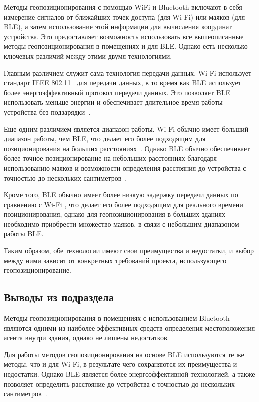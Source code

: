 Методы геопозиционирования с помощью WiFi и Bluetooth включают в себя измерение сигналов от ближайших точек доступа (для Wi-Fi) или маяков (для BLE), а затем использование этой информации для вычисления координат устройства. Это предоставляет возможность использовать все вышеописанные методы геопозиционирования в помещениях и для BLE. Однако есть несколько ключевых различий между этими двумя технологиями.

Главным различием служит сама технология передачи данных. Wi-Fi использует стандарт IEEE 802.11~\cite{ieee802} для передачи данных, в то время как BLE использует более энергоэффективный протокол передачи данных. Это позволяет BLE использовать меньше энергии и обеспечивает длительное время работы устройства без подзарядки~\cite{bluetooth}.

Еще одним различием является диапазон работы. Wi-Fi обычно имеет больший диапазон работы, чем BLE, что делает его более подходящим для позиционирования на больших расстояниях~\cite{wlan}. Однако BLE обычно обеспечивает более точное позиционирование на небольших расстояниях благодаря использованию маяков и возможности определения расстояния до устройства с точностью до нескольких сантиметров~\cite{android-analysis}.

Кроме того, BLE обычно имеет более низкую задержку передачи данных по сравнению с Wi-Fi \cite{android-analysis}, что делает его более подходящим для реального времени позиционирования, однако для геопозиционирования в больших зданиях необходимо приобрести множество маяков, в связи с небольшим диапазоном работы BLE.

Таким образом, обе технологии имеют свои преимущества и недостатки, и выбор между ними зависит от конкретных требований проекта, использующего геопозиционирование.

\clearpage

\subsection*{Выводы из подраздела}

Методы геопозиционирования в помещениях с использованием Bluetooth являются одними из наиболее эффективных средств определения местоположения агента внутри здания, однако не лишены недостатков.

Для работы методов геопозиционирования на основе BLE используются те же методы, что и для Wi-Fi, в результате чего сохраняются их преимущества и недостатки. Однако BLE является более энергоэффективной технологией, а также позволяет определить расстояние до устройства с точностью до нескольких сантиметров~\cite{bluetooth}. 

